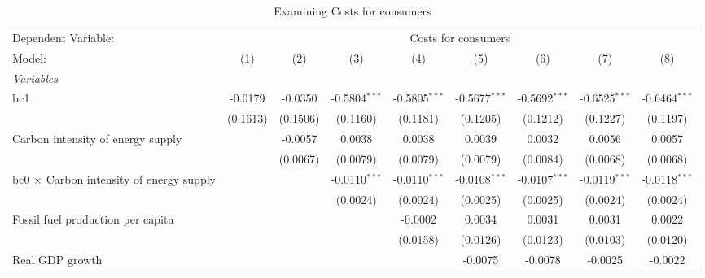 
\begin{table}[htbp]
   \caption{Examining Costs for consumers}
   \centering
   \begin{tabular}{lcccccccc}
      \tabularnewline \midrule \midrule
      Dependent Variable: & \multicolumn{8}{c}{Costs for consumers}\\
      Model:                                          & (1)      & (2)      & (3)             & (4)             & (5)             & (6)             & (7)             & (8)\\  
      \midrule
      \emph{Variables}\\
      bc1                                             & -0.0179  & -0.0350  & -0.5804$^{***}$ & -0.5805$^{***}$ & -0.5677$^{***}$ & -0.5692$^{***}$ & -0.6525$^{***}$ & -0.6464$^{***}$\\   
                                                      & (0.1613) & (0.1506) & (0.1160)        & (0.1181)        & (0.1205)        & (0.1212)        & (0.1227)        & (0.1197)\\   
      Carbon intensity of energy supply               &          & -0.0057  & 0.0038          & 0.0038          & 0.0039          & 0.0032          & 0.0056          & 0.0057\\   
                                                      &          & (0.0067) & (0.0079)        & (0.0079)        & (0.0079)        & (0.0084)        & (0.0068)        & (0.0068)\\   
      bc0 $\times$ Carbon intensity of energy supply  &          &          & -0.0110$^{***}$ & -0.0110$^{***}$ & -0.0108$^{***}$ & -0.0107$^{***}$ & -0.0119$^{***}$ & -0.0118$^{***}$\\   
                                                      &          &          & (0.0024)        & (0.0024)        & (0.0025)        & (0.0025)        & (0.0024)        & (0.0024)\\   
      Fossil fuel production per capita               &          &          &                 & -0.0002         & 0.0034          & 0.0031          & 0.0031          & 0.0022\\   
                                                      &          &          &                 & (0.0158)        & (0.0126)        & (0.0123)        & (0.0103)        & (0.0120)\\   
      Real GDP growth                                 &          &          &                 &                 & -0.0075         & -0.0078         & -0.0025         & -0.0022\\   

\end{tabular}
\end{table}
